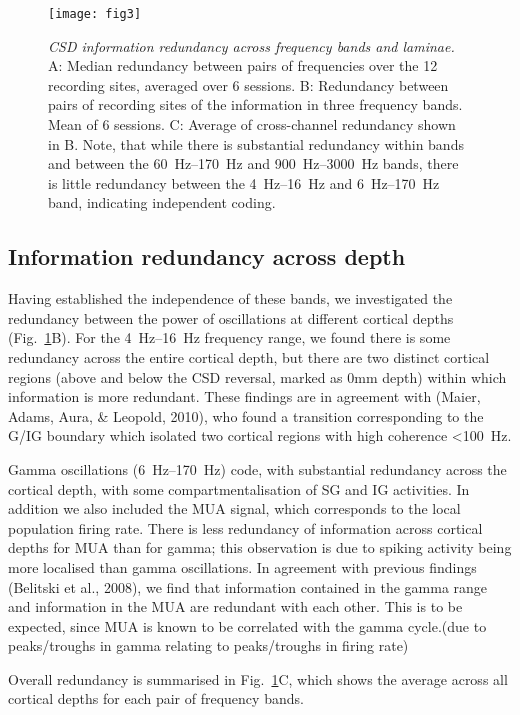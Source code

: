 \begin{figure}[htbp]
\centering \texttt{[image: fig3]}
%
\caption{%
\textit{\ac{CSD} information redundancy across frequency bands and laminae.}
A: Median redundancy between pairs of frequencies over the 12 recording 
sites, averaged over 6 sessions.
B: Redundancy between pairs of recording sites of the information in three 
frequency bands.
Mean of 6 sessions.
C: Average of cross-channel redundancy shown in B.
Note, that while there is substantial redundancy within bands and between the 
\SIrange{60}{170}{Hz} and \SIrange{900}{3000}{Hz} bands, there is little redundancy between the \SIrange{4}{16}{Hz} and
\SIrange{6}{170}{Hz} band, indicating independent coding.}%
\label{fig:lam_3}
%
\end{figure}

\subsection{Information redundancy across depth}
Having established the independence of these bands, we investigated the redundancy between the power of oscillations at different cortical depths (Fig.~\ref{fig:lam_3}B).
For the \SIrange{4}{16}{Hz} frequency range, we found there is some redundancy across the entire cortical depth, but there are two distinct cortical regions (above and below the \ac{CSD} reversal, marked as 0mm depth) within which information is more redundant.
These findings are in agreement with (Maier, Adams, Aura, \& Leopold, 2010), who found a transition corresponding to the \ac{G}/\ac{IG} boundary which isolated two cortical regions with high coherence \SI{<100}{Hz}.

Gamma oscillations (\SIrange{6}{170}{Hz}) code, with substantial redundancy across the cortical depth, with some compartmentalisation of \ac{SG} and \ac{IG} activities.
In addition we also included the \ac{MUA} signal, which corresponds to the local population firing rate.
There is less redundancy of information across cortical depths for \ac{MUA} than for gamma; this observation is due to spiking activity being more localised than gamma oscillations.
In agreement with previous findings (Belitski et al., 2008), we find that information contained in the gamma range and information in the \ac{MUA} are redundant with each other.
This is to be expected, since \ac{MUA} is known to be correlated with the gamma cycle.(due to peaks/troughs in gamma relating to peaks/troughs in firing rate)

Overall redundancy is summarised in Fig.~\ref{fig:lam_3}C, which shows the average across all cortical depths for each pair of frequency bands.

